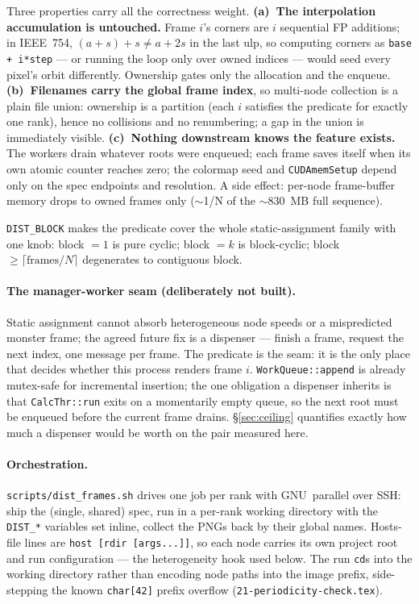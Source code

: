\documentclass[
	english,
	letterpaper, oneside
]{article}
\begin{document}
Three properties carry all the correctness weight. \textbf{(a)~The
interpolation accumulation is untouched.} Frame $i$'s corners are $i$
sequential FP additions; in IEEE~754, $(a{+}s){+}s \neq a{+}2s$ in the last
ulp, so computing corners as \texttt{base + i*step} --- or running the loop
only over owned indices --- would seed every pixel's orbit differently.
Ownership gates only the allocation and the enqueue. \textbf{(b)~Filenames
carry the global frame index}, so multi-node collection is a plain file
union: ownership is a partition (each $i$ satisfies the predicate for
exactly one rank), hence no collisions and no renumbering; a gap in the
union is immediately visible. \textbf{(c)~Nothing downstream knows the
feature exists.} The workers drain whatever roots were enqueued; each frame
saves itself when its own atomic counter reaches zero; the colormap seed and
\texttt{CUDAmemSetup} depend only on the spec endpoints and resolution. A
side effect: per-node frame-buffer memory drops to owned frames only
($\sim$1/N of the $\sim$830~MB full sequence).

\texttt{DIST\_BLOCK} makes the predicate cover the whole static-assignment
family with one knob: block $=1$ is pure cyclic; block $=k$ is block-cyclic;
block $\geq \lceil \mathrm{frames}/N \rceil$ degenerates to contiguous
block.

\paragraph{The manager-worker seam (deliberately not built).} Static
assignment cannot absorb heterogeneous node speeds or a mispredicted monster
frame; the agreed future fix is a dispenser --- finish a frame, request the
next index, one message per frame. The predicate is the seam: it is the only
place that decides whether this process renders frame $i$.
\texttt{WorkQueue::append} is already mutex-safe for incremental insertion;
the one obligation a dispenser inherits is that \texttt{CalcThr::run} exits
on a momentarily empty queue, so the next root must be enqueued before the
current frame drains. \S\ref{sec:ceiling} quantifies exactly how much a
dispenser would be worth on the pair measured here.

\paragraph{Orchestration.} \texttt{scripts/dist\_frames.sh} drives one job
per rank with GNU~parallel over SSH: ship the (single, shared) spec, run in
a per-rank working directory with the \texttt{DIST\_*} variables set inline,
collect the PNGs back by their global names. Hosts-file lines are
\texttt{host [rdir [args...]]}, so each node carries its own project root
and run configuration --- the heterogeneity hook used below. The run
\texttt{cd}s into the working directory rather than encoding node paths into
the image prefix, side-stepping the known \texttt{char[42]} prefix overflow
(\texttt{21-periodicity-check.tex}).
\end{document}

